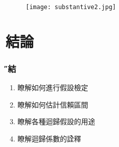 \documentclass[xcolor=dvipsnames]{beamer}
\begin{document}
\begin{frame}
\begin{center}
\begin{figure}
\texttt{[image: substantive2.jpg]}
\end{figure}
\end{center}
\end{frame}
\section{結論}
\begin{frame}\frametitle{\H 總結}
\begin{enumerate}
\item {\K 瞭解如何進行假設檢定}
\item {\K 瞭解如何估計信賴區間}
\item {\K 瞭解各種迴歸假設的用途}
\item {\K 瞭解迴歸係數的詮釋}
\end{enumerate}
\end{frame}
\end{document}
